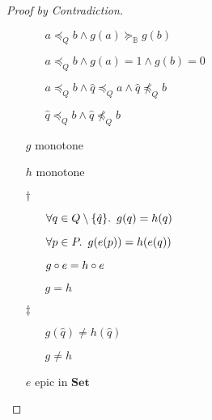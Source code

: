 \begin{lemma}
\begin{proof}[Proof by Contradiction]
\begin{itemize}
\begin{itemize}
          \item[\imps]
            $a\preceq_Qb\wedge g(a)\succeq_{\mathbb{B}}g(b)$

          \item[\imps]
            $a\preceq_Qb\wedge g(a) = 1\wedge g(b) = 0$

          \item[\imps]
            $a\preceq_Qb\wedge \hat{q}\preceq_Qa\wedge \hat{q}\npreceq_Qb$
          \item[\imps]
            $\hat{q}\preceq_Qb\wedge \hat{q}\npreceq_Qb$
        \end{itemize}

      \item[\contras]$g$ monotone
        \marginnote{\Contra-$\star$}

      \item[\phs] $h$ monotone

      \item[$\dagger$]
        \begin{itemize}
          \item[\phantom{\imps}]
            $\forall q\in Q\setminus\{\hat{q}\}\ldotp~g(q) = h(q)$

          \item[\imps]
            $\forall p\in P\ldotp~g(e(p)) = h(e(q))$


          \item[\iffs]
            $g\circ e = h\circ e$
            \marginnote{\Def-$=$}

          \item[\imps]
            $g = h$
        \end{itemize}

      \item[$\ddagger$]
        \begin{itemize}
          \item[\phs]
            $g(\hat{q})\neq h(\hat{q})$

          \item[\imps]
            $g\neq h$
            \marginnote{\Def-$\neq$}
        \end{itemize}


        \item[\contras] $e$ epic in $\mathbf{Set}$
          \qedhere
          \marginnote{\Contra-$\dagger$,~$\ddagger$}
    \end{itemize}
  \end{proof}
\end{lemma}

